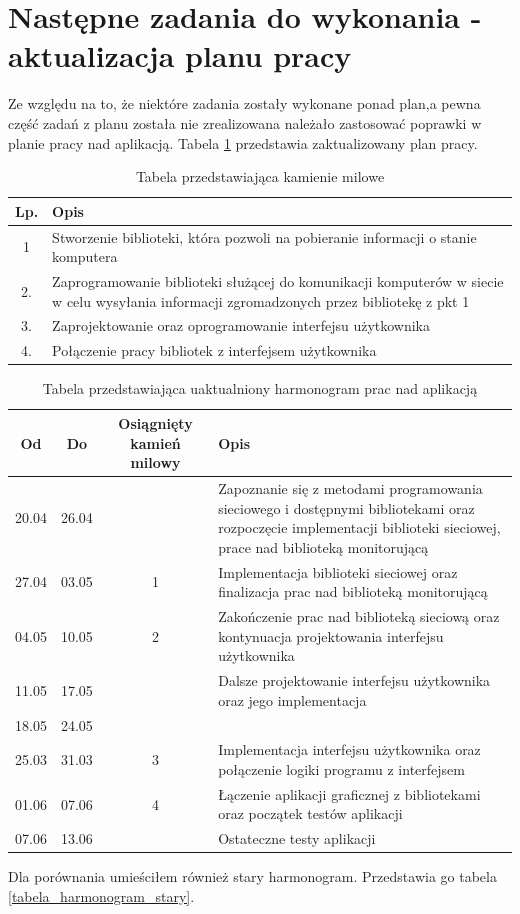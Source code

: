 \documentclass[a4paper]{article}
\begin{document}
\section{Następne zadania do wykonania - aktualizacja planu pracy}
Ze względu na to, że niektóre zadania zostały wykonane ponad plan,a pewna część zadań z planu została nie zrealizowana należało zastosować poprawki w planie pracy nad aplikacją. Tabela \ref{tabela_harmonogram} przedstawia zaktualizowany plan pracy.
\begin{table}[h]
			\centering
			\begin{tabularx}{0.65\textwidth}{|c|X|}
				\hline
				Lp. & Opis \\ \hline
				1 & Stworzenie biblioteki, która pozwoli na pobieranie informacji o stanie komputera \\ \hline
				2. & Zaprogramowanie biblioteki służącej do komunikacji komputerów w siecie w celu wysyłania informacji zgromadzonych przez bibliotekę z pkt 1 \\ \hline
				3. & Zaprojektowanie oraz oprogramowanie interfejsu użytkownika \\ \hline
				4. & Połączenie pracy bibliotek z interfejsem użytkownika \\ \hline
			\end{tabularx}
			\caption{Tabela przedstawiająca kamienie milowe}
		\end{table}
\begin{table}[h]
			\centering
			\begin{tabularx}{0.8\textwidth}{|c|c|c|X|}
				\hline
				Od & Do & Osiągnięty kamień milowy & Opis \\ \hline
				20.04 & 26.04 &  & Zapoznanie się z metodami programowania sieciowego i dostępnymi bibliotekami oraz  rozpoczęcie implementacji biblioteki sieciowej, prace nad biblioteką monitorującą\\ \hline
				27.04 & 03.05 & 1 & Implementacja biblioteki sieciowej oraz finalizacja prac nad biblioteką monitorującą \\ \hline
				04.05 & 10.05 & 2 & Zakończenie prac nad biblioteką sieciową oraz kontynuacja projektowania interfejsu użytkownika \\ \hline
				11.05 & 17.05 &    & Dalsze projektowanie interfejsu użytkownika oraz jego implementacja \\ \hline
				18.05 & 24.05 &  &  \\ \hline
				25.03 & 31.03 & 3 & Implementacja interfejsu użytkownika oraz połączenie logiki programu z interfejsem \\ \hline
				01.06 & 07.06 & 4 & Łączenie aplikacji graficznej z bibliotekami oraz początek testów aplikacji \\ \hline
				07.06 & 13.06 &  & Ostateczne testy aplikacji \\ \hline
			\end{tabularx}
			\caption{Tabela przedstawiająca uaktualniony harmonogram prac nad aplikacją}
			\label{tabela_harmonogram}
		\end{table}
Dla porównania umieściłem również stary harmonogram. Przedstawia go tabela \ref{tabela_harmonogram_stary}.
\end{document}
